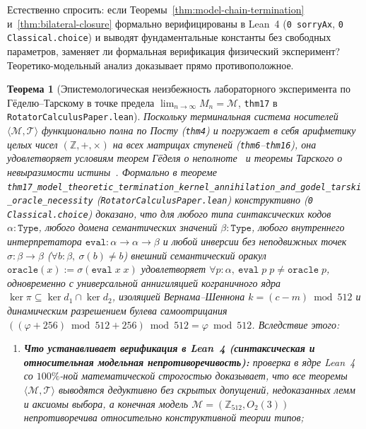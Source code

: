 \documentclass[11pt,a4paper]{article}
\newtheorem{theorem}{Теорема}[section]
\theoremstyle{definition}
\theoremstyle{remark}
\begin{document}
Естественно спросить: если Теоремы~\ref{thm:model-chain-termination} и~\ref{thm:bilateral-closure} формально верифицированы в Lean~4 (\texttt{0 sorryAx}, \texttt{0 Classical.choice}) и выводят фундаментальные константы без свободных параметров, заменяет ли формальная верификация физический эксперимент? Теоретико-модельный анализ доказывает прямо противоположное.

\begin{theorem}[Эпистемологическая неизбежность лабораторного эксперимента по Гёделю--Тарскому в точке предела $\lim_{n\to\infty} M_n = \mathcal{M}$, \texttt{thm17} в \texttt{RotatorCalculusPaper.lean}]
\label{thm:godel-tarski-experiment}
Поскольку терминальная система носителей $\langle\mathcal{M},\mathcal{T}\rangle$ функционально полна по Посту (\texttt{thm4}) и погружает в себя арифметику целых чисел $(\mathbb{Z},+,\times)$ на всех матрицах ступеней (\texttt{thm6}--\texttt{thm16}), она удовлетворяет условиям теорем Гёделя о неполноте~\cite{Godel1931} и теоремы Тарского о невыразимости истины~\cite{Tarski1936}. Формально в теореме \texttt{thm17\_model\_theoretic\_termination\_kernel\_annihilation\_and\_godel\_tarski\_oracle\_necessity} (\texttt{RotatorCalculusPaper.lean}) конструктивно (\texttt{0 Classical.choice}) доказано, что для любого типа синтаксических кодов $\alpha : \texttt{Type}$, любого домена семантических значений $\beta : \texttt{Type}$, любого внутреннего интерпретатора $\texttt{eval} : \alpha \to \alpha \to \beta$ и любой инверсии без неподвижных точек $\sigma : \beta \to \beta$ ($\forall b : \beta,\ \sigma(b)\ne b$) внешний семантический оракул $\texttt{oracle}(x) := \sigma(\texttt{eval}\;x\;x)$ удовлетворяет $\forall p : \alpha,\ \texttt{eval}\;p\;p \ne \texttt{oracle}\;p$, одновременно с универсальной аннигиляцией кограничного ядра $\ker\pi \subseteq \ker d_1 \cap \ker d_2$, изоляцией Вернама--Шеннона $k = (c-m)\bmod 512$ и динамическим разрешением булева самоотрицания $((\varphi+256)\bmod 512 + 256)\bmod 512 = \varphi\bmod 512$. Вследствие этого:
\begin{enumerate}[label=\textbf{(\roman*)},leftmargin=*]
\item \textbf{Что устанавливает верификация в Lean~4 (синтаксическая и относительная модельная непротиворечивость):}
  проверка в ядре Lean~4 со $100\%$-ной математической строгостью доказывает, что все теоремы $\langle\mathcal{M},\mathcal{T}\rangle$ выводятся дедуктивно без скрытых допущений, недоказанных лемм и аксиомы выбора, а конечная модель $\mathcal{M} = (\mathbb{Z}_{512}, O_2(3))$ непротиворечива относительно конструктивной теории типов;

\end{enumerate}
\end{theorem}
\end{document}

